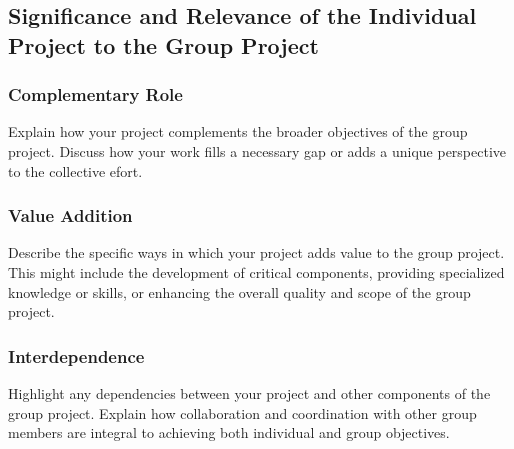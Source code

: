 \subsection{Significance and Relevance of the Individual Project to the Group Project}

\subsubsection{Complementary Role}
Explain how your project complements the broader objectives of the group project. Discuss how your work fills a necessary gap or adds a unique perspective to the collective efort.

\subsubsection{Value Addition}
Describe the specific ways in which your project adds value to the group project. This might include the development of critical components, providing specialized knowledge or skills, or enhancing the overall quality and scope of the group project.

\subsubsection{Interdependence}
Highlight any dependencies between your project and other components of the group project. Explain how collaboration and coordination with other group members are integral to achieving both individual and group objectives.
